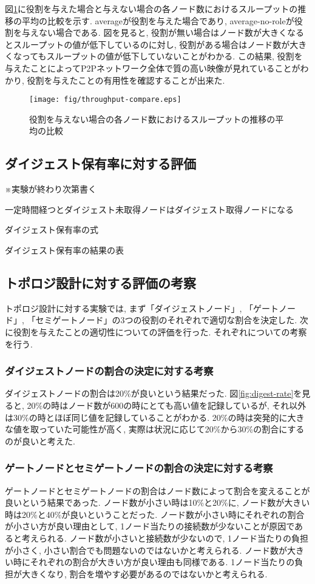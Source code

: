 \newpage

図\ref{fig:throughput-compare}に役割を与えた場合と与えない場合の各ノード数におけるスループットの推移の平均の比較を示す. averageが役割を与えた場合であり, average-no-roleが役割を与えない場合である. 図を見ると, 役割が無い場合はノード数が大きくなるとスループットの値が低下しているのに対し, 役割がある場合はノード数が大きくなってもスループットの値が低下していないことがわかる. この結果, 役割を与えたことによってP2Pネットワーク全体で質の高い映像が見れていることがわかり, 役割を与えたことの有用性を確認することが出来た.

\begin{figure}[h]
  \centering
  \texttt{[image: fig/throughput-compare.eps]}
  \caption{役割を与えない場合の各ノード数におけるスループットの推移の平均の比較}
  \label{fig:throughput-compare}
\end{figure}

\newpage

\subsection{ダイジェスト保有率に対する評価}
※実験が終わり次第書く

一定時間経つとダイジェスト未取得ノードはダイジェスト取得ノードになる

ダイジェスト保有率の式

ダイジェスト保有率の結果の表

\subsection{トポロジ設計に対する評価の考察}
トポロジ設計に対する実験では, まず「ダイジェストノード」, 「ゲートノード」, 「セミゲートノード」の3つの役割のそれぞれで適切な割合を決定した. 次に役割を与えたことの適切性についての評価を行った. それぞれについての考察を行う.

\subsubsection{ダイジェストノードの割合の決定に対する考察}
ダイジェストノードの割合は20\%が良いという結果だった. 図\ref{fig:digest-rate}を見ると, 20\%の時はノード数が600の時にとても高い値を記録しているが, それ以外は30\%の時とほぼ同じ値を記録していることがわかる. 20\%の時は突発的に大きな値を取っていた可能性が高く, 実際は状況に応じて20\%から30\%の割合にするのが良いと考えた.

\subsubsection{ゲートノードとセミゲートノードの割合の決定に対する考察}
ゲートノードとセミゲートノードの割合はノード数によって割合を変えることが良いという結果であった. ノード数が小さい時は10\%と20\%に, ノード数が大きい時は20\%と40\%が良いということだった. ノード数が小さい時にそれぞれの割合が小さい方が良い理由として, 1ノード当たりの接続数が少ないことが原因であると考えられる. ノード数が小さいと接続数が少ないので, 1ノード当たりの負担が小さく, 小さい割合でも問題ないのではないかと考えられる. ノード数が大きい時にそれぞれの割合が大きい方が良い理由も同様である. 1ノード当たりの負担が大きくなり, 割合を増やす必要があるのではないかと考えられる.

